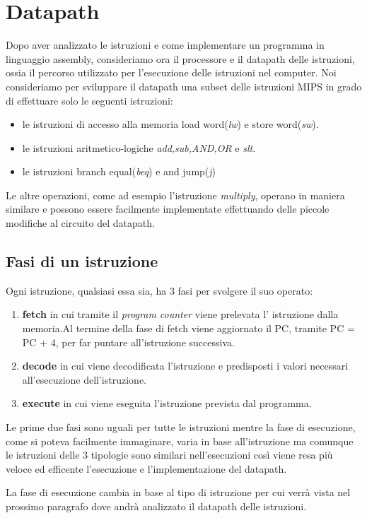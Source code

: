 \chapter{Datapath}
Dopo aver analizzato le istruzioni e come implementare un programma in linguaggio assembly,
consideriamo ora il processore e il datapath delle istruzioni, ossia il percorso
utilizzato per l'esecuzione delle istruzioni nel computer.
Noi consideriamo per sviluppare il datapath una subset delle istruzioni MIPS in grado di effettuare
solo le seguenti istruzioni:
\begin{itemize}
  \item le istruzioni di accesso alla memoria load word(\emph{lw}) e store word(\emph{sw}).
  \item le istruzioni aritmetico-logiche \emph{add,sub,AND,OR} e \emph{slt}.
  \item le istruzioni branch equal(\emph{beq}) e and jump(\emph{j})
\end{itemize}
Le altre operazioni, come ad esempio l'istruzione \emph{multiply}, operano in maniera
similare e possono essere facilmente implementate effettuando delle piccole modifiche
al circuito del datapath.

\section{Fasi di un istruzione}
Ogni istruzione, qualsiasi essa sia, ha 3 fasi per svolgere il suo operato:
\begin{enumerate}
  \item \textbf{fetch} in cui tramite il \emph{program counter} viene prelevata l'
                       istruzione dalla memoria.Al termine della fase di fetch
                       viene aggiornato il PC, tramite PC = PC + 4, per far puntare all'istruzione successiva.
  \item \textbf{decode} in cui viene decodificata l'istruzione e predisposti i valori
                        necessari all'esecuzione dell'istruzione.
  \item \textbf{execute} in cui viene eseguita l'istruzione prevista dal programma.
\end{enumerate}
Le prime due fasi sono uguali per tutte le istruzioni mentre la fase di esecuzione,
come si poteva facilmente immaginare, varia in base all'istruzione ma comunque le
istruzioni delle 3 tipologie sono similari nell'esecuzioni così viene resa più veloce
ed efficente l'esecuzione e l'implementazione del datapath.




La fase di esecuzione cambia in base al tipo di istruzione per cui verrà vista nel
prossimo paragrafo dove andrà analizzato il datapath delle istruzioni.
